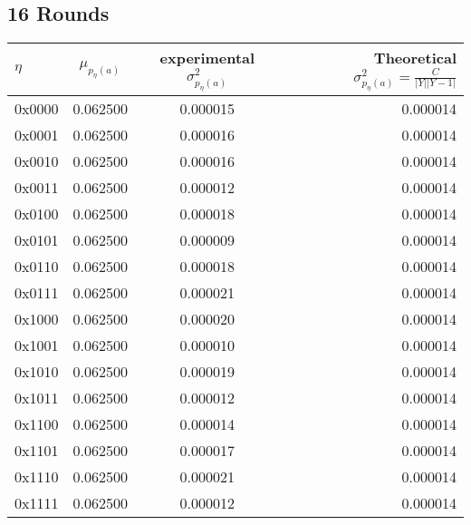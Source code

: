 \documentclass[9pt]{article}
\begin{document}
\subsection{16 Rounds}
\begin{tabular}{l*{2}{c}r}
$\eta$ & $\mu_{p_{\eta}(a)}$ & experimental $\sigma^2_{p_{\eta}(a)}$ & Theoretical $\sigma^2_{p_{\eta}(a)} = \frac{C}{|Y||Y-1|}$ \\
\hline
0x0000 & 0.062500 & 0.000015 & 0.000014 \\
0x0001 & 0.062500 & 0.000016 & 0.000014 \\
0x0010 & 0.062500 & 0.000016 & 0.000014 \\
0x0011 & 0.062500 & 0.000012 & 0.000014 \\
0x0100 & 0.062500 & 0.000018 & 0.000014 \\
0x0101 & 0.062500 & 0.000009 & 0.000014 \\
0x0110 & 0.062500 & 0.000018 & 0.000014 \\
0x0111 & 0.062500 & 0.000021 & 0.000014 \\
0x1000 & 0.062500 & 0.000020 & 0.000014 \\
0x1001 & 0.062500 & 0.000010 & 0.000014 \\
0x1010 & 0.062500 & 0.000019 & 0.000014 \\
0x1011 & 0.062500 & 0.000012 & 0.000014 \\
0x1100 & 0.062500 & 0.000014 & 0.000014 \\
0x1101 & 0.062500 & 0.000017 & 0.000014 \\
0x1110 & 0.062500 & 0.000021 & 0.000014 \\
0x1111 & 0.062500 & 0.000012 & 0.000014 \\
\end{tabular}
\end{document}
